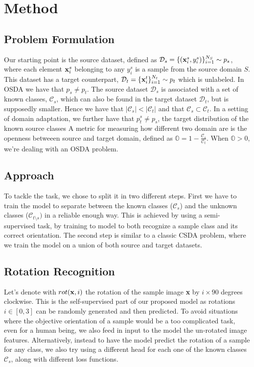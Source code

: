 \documentclass[10pt,twocolumn,letterpaper]{article}
\begin{document}
\section{Method}
\label{sec:method}

\subsection{Problem Formulation}
\label{sec:problemformulation}
Our starting point is the source dataset, defined as $\mathcal{D}_s = \{({\bf x}_i^s, y_i^s)\}_{i=1}^{N_S} \sim p_s$, where each element ${\bf x}_i^s$ belonging to any $y_i^s$ is a sample from the source domain $S$.
This dataset has a target counterpart, $\mathcal{D}_t = \{{\bf x}_i^t\}_{i=1}^{N_t} \sim p_t$ which is unlabeled.
In OSDA we have that $p_s \neq p_t$.
The source dataset $\mathcal{D}_s$ is associated with a set of known classes, $\mathcal{C}_s$, which can also be found in the target dataset $\mathcal{D}_t$, but is supposedly smaller.
Hence we have that $|\mathcal{C}_s| < |\mathcal{C}_t|$ and that $\mathcal{C}_s \subset \mathcal{C}_t$.
In a setting of domain adaptation, we further have that $p_t^s \neq p_s$, the target distribution of the known source classes
A metric for measuring how different two domain are is the openness betweeen source and target domain\cite{bendale2015open}, defined as $\displaystyle \mathbb{O} = 1-\frac{\mathcal{C}_s}{\mathcal{C}_t}$.
When $\mathbb{O} > 0$, we're dealing with an OSDA problem.

\subsection{Approach}
\label{sec:apporach}
To tackle the task, we chose to split it in two different steps.
First we have to train the model to separate between the known classes ($\mathcal{C}_s$) and the unknown classes ($\mathcal{C}_{t\setminus s})$ in a reliable enough way.
This is achieved by using a semi-supervised task, by training to model to both recognize a sample class and its correct orientation.
The second step is similar to a classic CSDA problem, where we train the model on a union of both source and target datasets.

\subsection{Rotation Recognition}

Let's denote with $rot({\bf x}, i)$ the rotation of the sample image {\bf x} by $i\times 90$ degrees clockwise.
This is the self-supervised part of our proposed model as rotations $i \in [0, 3]$ can be randomly generated and then predicted.
To avoid situations where the objective orientation of a sample would be a too complicated task, even for a human being, we also feed in input to the model the un-rotated image features.
Alternatively, instead to have the model predict the rotation of a sample for any class, we also try using a different head for each one of the known classes $\mathcal{C}_s$, along with different loss functions.
\end{document}
